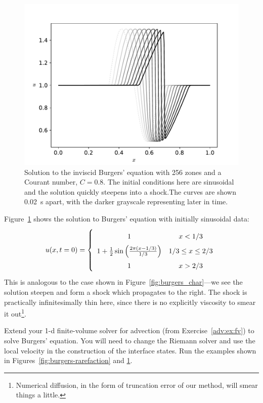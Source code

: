 \begin{figure}[t]
\centering
\includegraphics[width=0.8\linewidth]{fv-burger-sine}
\caption[Shock solutions to the inviscid Burgers'
  equation]{\label{fig:burgers-shock} Solution to the inviscid
  Burgers' equation with 256 zones and a Courant number, $C = 0.8$.
  The initial conditions here are sinusoidal and the solution quickly
  steepens into a shock.The curves are shown 0.02~s apart, with the
  darker grayscale representing later in
  time. \\ }
\end{figure}

Figure~\ref{fig:burgers-shock} shows the solution to Burgers'
equation with initially sinusoidal data:
\begin{equation}
\renewcommand{\arraystretch}{1.75}
u(x, t=0) = \left \{ \begin{array}{cc}
    1   & x < 1/3 \\
    1 + \frac{1}{2} \sin\left (\frac{2\pi (x - 1/3)}{1/3}\right ) & 1/3 \le x \le 2/3 \\
    1   & x > 2/3 
\end{array}
\right .
\renewcommand{\arraystretch}{1.0}
\end{equation}
This is analogous to the case shown in
Figure~\ref{fig:burgers_char}---we see the solution steepen and form a
shock which propagates to the right.  The shock is practically infinitesimally thin
here, since there is no explicitly viscosity to smear it out\footnote{Numerical diffusion,
in the form of truncation error of our method, will smear things a little.}.

\begin{exercise}
{Extend your 1-d finite-volume solver for advection (from
  Exercise~\ref{adv:ex:fv}) to solve Burgers' equation.  You will
  need to change the Riemann solver and use the local velocity in the
  construction of the interface states.  Run the examples shown in
  Figures~\ref{fig:burgers-rarefaction} and \ref{fig:burgers-shock}}.
\end{exercise}

